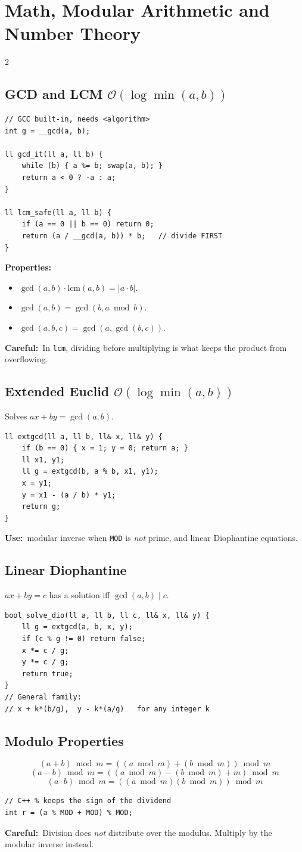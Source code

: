 \documentclass[10pt]{article}
\newcommand{\code}[1]{\texttt{\small #1}}
\newcommand{\sub}[2]{\subsection[#1]{#1\hspace{0.6em}%
  \textnormal{\color{accent2}\small$\mathcal{O}(#2)$}}}
\newcommand{\uses}[1]{{\color{accent2}\footnotesize\textbf{Use:}}~{\footnotesize #1}\par}
\newcommand{\warn}[1]{{\color{warnc}\footnotesize\textbf{Careful:}}~{\footnotesize #1}\par}
\begin{document}
\section{Math, Modular Arithmetic and Number Theory}
\begin{multicols}{2}

\sub{GCD and LCM}{\log \min(a,b)}
\begin{lstlisting}
// GCC built-in, needs <algorithm>
int g = __gcd(a, b);

ll gcd_it(ll a, ll b) {
    while (b) { a %= b; swap(a, b); }
    return a < 0 ? -a : a;
}

ll lcm_safe(ll a, ll b) {
    if (a == 0 || b == 0) return 0;
    return (a / __gcd(a, b)) * b;   // divide FIRST
}
\end{lstlisting}
\textbf{Properties:}
\begin{itemize}
    \item $\gcd(a,b)\cdot\mathrm{lcm}(a,b) = |a\cdot b|$.
    \item $\gcd(a,b) = \gcd(b, a \bmod b)$.
    \item $\gcd(a,b,c) = \gcd(a, \gcd(b,c))$.
\end{itemize}
\warn{In \code{lcm}, dividing before multiplying is what keeps the
product from overflowing.}

\sub{Extended Euclid}{\log \min(a,b)}
Solves $ax + by = \gcd(a,b)$.
\begin{lstlisting}
ll extgcd(ll a, ll b, ll& x, ll& y) {
    if (b == 0) { x = 1; y = 0; return a; }
    ll x1, y1;
    ll g = extgcd(b, a % b, x1, y1);
    x = y1;
    y = x1 - (a / b) * y1;
    return g;
}
\end{lstlisting}
\uses{modular inverse when \code{MOD} is \emph{not} prime, and linear
Diophantine equations.}

\subsection{Linear Diophantine}
$ax + by = c$ has a solution iff $\gcd(a,b) \mid c$.
\begin{lstlisting}
bool solve_dio(ll a, ll b, ll c, ll& x, ll& y) {
    ll g = extgcd(a, b, x, y);
    if (c % g != 0) return false;
    x *= c / g;
    y *= c / g;
    return true;
}
// General family:
// x + k*(b/g),  y - k*(a/g)   for any integer k
\end{lstlisting}

\subsection{Modulo Properties}
\[(a+b) \bmod m = ((a \bmod m)+(b \bmod m)) \bmod m\]
\[(a-b) \bmod m = ((a \bmod m)-(b \bmod m)+m) \bmod m\]
\[(a \cdot b) \bmod m = ((a \bmod m)(b \bmod m)) \bmod m\]
\begin{lstlisting}
// C++ % keeps the sign of the dividend
int r = (a % MOD + MOD) % MOD;
\end{lstlisting}
\warn{Division does \emph{not} distribute over the modulus. Multiply by
the modular inverse instead.}


\end{multicols}
\end{document}
